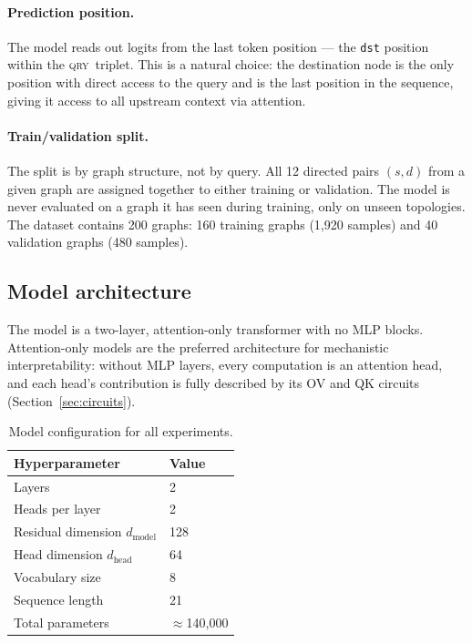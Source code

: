 \documentclass[11pt, a4paper]{article}
\newcommand{\QRY}{\textsc{qry}}
\begin{document}
\paragraph{Prediction position.}
The model reads out logits from the last token position --- the \texttt{dst}
position within the \QRY\ triplet.  This is a natural choice: the
destination node is the only position with direct access to the query
and is the last position in the sequence, giving it access to all
upstream context via attention.

\paragraph{Train/validation split.}
The split is by graph structure, not by query.  All 12 directed pairs
$(s, d)$ from a given graph are assigned together to either training or
validation.  The model is never evaluated on a graph it has seen during
training, only on unseen topologies.  The dataset contains 200 graphs:
160 training graphs (1{,}920 samples) and 40 validation graphs (480
samples).

\subsection{Model architecture}

The model is a two-layer, attention-only transformer with no MLP
blocks.  Attention-only models are the preferred architecture for
mechanistic interpretability: without MLP layers, every computation is
an attention head, and each head's contribution is fully described by
its OV and QK circuits (Section~\ref{sec:circuits}).

\begin{table}[H]
\centering
\begin{tabular}{@{}ll@{}}
\toprule
Hyperparameter & Value \\
\midrule
Layers             & 2 \\
Heads per layer    & 2 \\
Residual dimension $d_{\mathrm{model}}$ & 128 \\
Head dimension $d_{\mathrm{head}}$      & 64 \\
Vocabulary size    & 8 \\
Sequence length    & 21 \\
Total parameters   & $\approx$140{,}000 \\
\bottomrule
\end{tabular}
\caption{Model configuration for all experiments.}
\label{tab:model}
\end{table}
\end{document}
